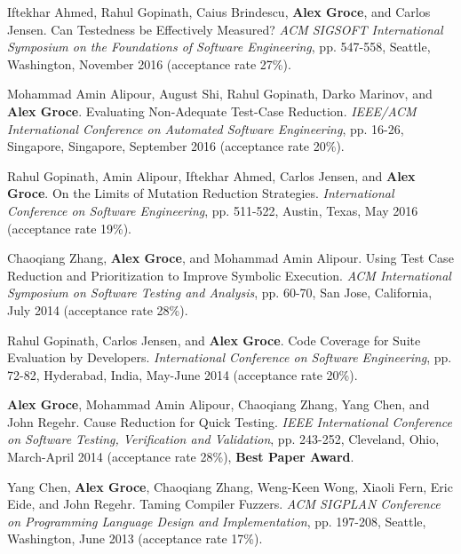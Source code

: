 \documentclass[ComputerScience,10pt]{vita}
\begin{document}
\begin{vita}
\begin{Selected Recent Conference Publications}
\item Iftekhar Ahmed, Rahul Gopinath, Caius Brindescu, {\bf Alex Groce}, and Carlos Jensen.
\newblock Can Testedness be Effectively Measured?
\newblock \emph{ACM SIGSOFT International Symposium on the Foundations of Software Engineering},  pp. 547-558, Seattle, Washington, November 2016 (acceptance rate 27\%).

\item Mohammad Amin Alipour, August Shi, Rahul Gopinath, Darko Marinov, and {\bf Alex Groce}.
\newblock Evaluating Non-Adequate Test-Case Reduction.
\newblock \emph{IEEE/ACM International Conference on Automated Software Engineering}, pp. 16-26, Singapore, Singapore, September 2016 (acceptance rate 20\%).

\item Rahul Gopinath, Amin Alipour, Iftekhar Ahmed, Carlos Jensen, and {\bf Alex Groce}.
\newblock On the Limits of Mutation Reduction Strategies.
\newblock \emph{International Conference on Software Engineering}, pp. 511-522, Austin, Texas, May 2016 (acceptance rate 19\%).

\item
Chaoqiang Zhang, {\bf Alex Groce}, and Mohammad Amin Alipour.
\newblock Using Test Case Reduction and Prioritization to Improve Symbolic Execution.
\newblock \emph{ACM International Symposium on Software Testing and Analysis}, pp. 60-70, San Jose, California, July 2014 (acceptance rate 28\%).

\item
Rahul Gopinath, Carlos Jensen, and {\bf Alex Groce}.
\newblock Code Coverage for Suite Evaluation by Developers.
\newblock \emph{International Conference on Software Engineering}, pp. 72-82, Hyderabad, India, May-June 2014 (acceptance rate 20\%). 

\item
{\bf Alex Groce}, Mohammad Amin Alipour, Chaoqiang Zhang, Yang Chen, and John Regehr.
\newblock Cause Reduction for Quick Testing.
\newblock \emph {IEEE International Conference on Software Testing, Verification and Validation}, pp. 243-252, Cleveland, Ohio, March-April 2014 (acceptance rate 28\%), {\bf Best Paper Award}.

\item Yang Chen, {\bf Alex Groce}, Chaoqiang Zhang, Weng-Keen Wong, Xiaoli Fern, Eric Eide, and John Regehr.
\newblock Taming Compiler Fuzzers.
\newblock \emph{ACM SIGPLAN Conference on Programming Language Design and Implementation}, pp. 197-208, Seattle, Washington, June 2013 (acceptance rate 17\%).


\end{Selected Recent Conference Publications}


\end{vita}
\end{document}
